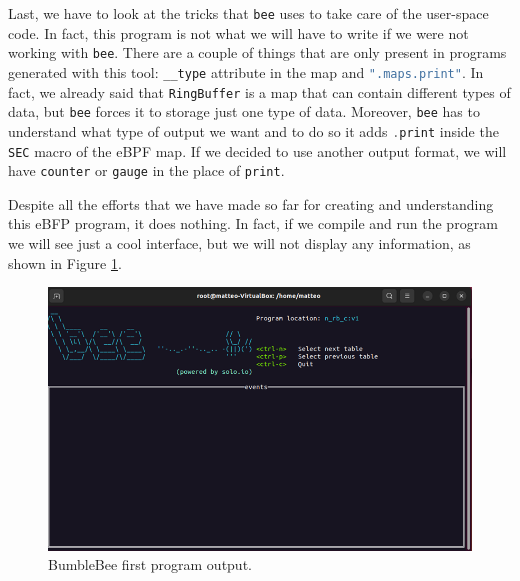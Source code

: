 Last, we have to look at the tricks that \colorbox{backcolour}{\lstinline[style=highlight, language=bash]|bee|} uses to take care of the user-space code.
In fact, this program is not what we will have to write if we were not working with \colorbox{backcolour}{\lstinline[style=highlight, language=bash]|bee|}.
There are a couple of things that are only present in programs generated with this tool: \colorbox{backcolour}{\lstinline[style=cstyle, language=C]|__type|} attribute in the map and \colorbox{backcolour}{\lstinline[style=cstyle, language=C]|".maps.print"|}.
In fact, we already said that \colorbox{backcolour}{\lstinline[style=highlight, language=bash]|RingBuffer|} is a map that can contain different types of data, but \colorbox{backcolour}{\lstinline[style=highlight, language=bash]|bee|} forces it to storage just one type of data.
Moreover, \colorbox{backcolour}{\lstinline[style=highlight, language=bash]|bee|} has to understand what type of output we want and to do so it adds \colorbox{backcolour}{\lstinline[style=cstyle, language=C]|.print|} inside the \colorbox{backcolour}{\lstinline[style=cstyle, language=C]|SEC|} macro of the eBPF map.
If we decided to use another output format, we will have \colorbox{backcolour}{\lstinline[style=highlight, language=bash]|counter|} or \colorbox{backcolour}{\lstinline[style=highlight, language=bash]|gauge|} in the place of \colorbox{backcolour}{\lstinline[style=highlight, language=bash]|print|}.

Despite all the efforts that we have made so far for creating and understanding this eBFP program, it does nothing.
In fact, if we compile and run the program we will see just a cool interface, but we will not display any information, as shown in Figure \ref{fig:bee_first_program_output}.

\begin{figure}[h]
	\centering
	\includegraphics[width=0.7\linewidth]{images/LinuxDevelopment/n_rb_p_display.png}
	\caption{BumbleBee first program output.}
	\label{fig:bee_first_program_output}
\end{figure}

